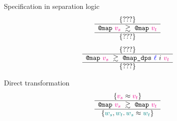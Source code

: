 \begin{frame}{Specification in separation logic}
\LARGE
\[
    \iSimvHoarePretty{
        ???
    }{
        \datalangCall{\datalangFnptr{\texttt{map}}}{\mathcolor{magenta}{\datalangVal_s}}
    }{
        \datalangCall{\datalangFnptr{\texttt{map}}}{\mathcolor{magenta}{\datalangVal_t}}
    }{
        ???
    }
\]
\vfill
\[
    \iSimvHoarePretty{
        ???
    }{
        \datalangCall{\datalangFnptr{\texttt{map}}}{\mathcolor{magenta}{\datalangVal_s}}
    }{
        \datalangCall{\datalangFnptr{\texttt{map\_dps}}}{\mathcolor{blue}{\datalangLoc}\ \datalangIdx\ \mathcolor{magenta}{\datalangVal_t}}
    }{
        ???
    }
\]
\end{frame}

\begin{frame}{Direct transformation}
\Large
\[
    \iSimvHoarePretty{
        \mathcolor{magenta}{\datalangVal_s} \iSimilar \mathcolor{magenta}{\datalangVal_t}
    }{
        \datalangCall{\datalangFnptr{\texttt{map}}}{\mathcolor{magenta}{\datalangVal_s}}
    }{
        \datalangCall{\datalangFnptr{\texttt{map}}}{\mathcolor{magenta}{\datalangVal_t}}
    }{
        \mathcolor{teal}{\datalangValTwo_s}, \mathcolor{teal}{\datalangValTwo_t} \ldotp
        \mathcolor{teal}{\datalangValTwo_s} \iSimilar \mathcolor{teal}{\datalangValTwo_t}
    }
\]
\vfill
\begin{mathpar}
\end{mathpar}
\end{frame}

